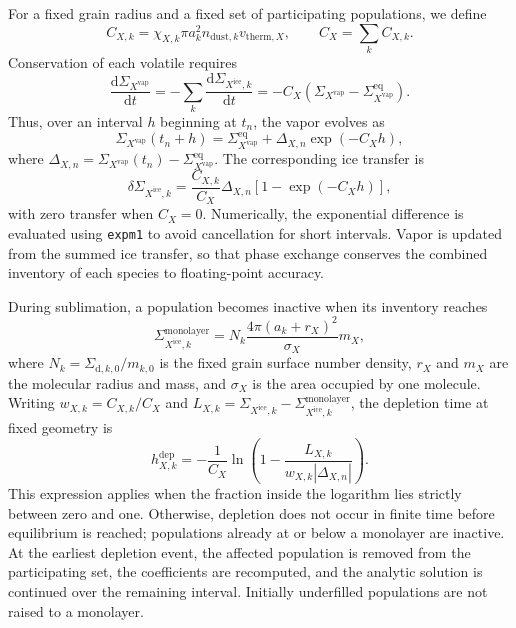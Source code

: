 For a fixed grain radius and a fixed set of participating populations,
we define
\begin{equation}
    C_{X,k}=\chi_{X,k}\pi a_k^2
    n_{\mathrm{dust},k}v_{\mathrm{therm},X},
    \qquad C_X=\sum_k C_{X,k}.
\end{equation}
Conservation of each volatile requires
\begin{equation}
    \frac{\mathrm d\Sigma_{X^{\mathrm{vap}}}}{\mathrm dt}
    =-\sum_k\frac{\mathrm d\Sigma_{X^{\mathrm{ice}},k}}{\mathrm dt}
    =-C_X\left(\Sigma_{X^{\mathrm{vap}}}
    -\Sigma_{X^{\mathrm{vap}}}^{\mathrm{eq}}\right).
\end{equation}
Thus, over an interval $h$ beginning at $t_n$, the vapor evolves as
\begin{equation}
    \Sigma_{X^{\mathrm{vap}}}(t_n+h)
    =\Sigma_{X^{\mathrm{vap}}}^{\mathrm{eq}}
    +\Delta_{X,n}\exp(-C_Xh),
    \label{eq:vapor_chem_solution}
\end{equation}
where $\Delta_{X,n}=\Sigma_{X^{\mathrm{vap}}}(t_n)
-\Sigma_{X^{\mathrm{vap}}}^{\mathrm{eq}}$. The corresponding ice
transfer is
\begin{equation}
    \delta\Sigma_{X^{\mathrm{ice}},k}
    =\frac{C_{X,k}}{C_X}\Delta_{X,n}
    \left[1-\exp(-C_Xh)\right],
    \label{eq:analytic_ice_substep}
\end{equation}
with zero transfer when $C_X=0$. Numerically, the exponential
difference is evaluated using \texttt{expm1} to avoid cancellation
for short intervals. Vapor is updated from the summed ice transfer,
so that phase exchange conserves the combined inventory of each
species to floating-point accuracy.

During sublimation, a population becomes inactive when its inventory
reaches
\begin{equation}
    \Sigma_{X^{\mathrm{ice}},k}^{\mathrm{monolayer}}
    =N_k\frac{4\pi(a_k+r_X)^2}{\sigma_X}m_X,
    \label{eq:monolayer_surface_density}
\end{equation}
where $N_k=\Sigma_{\mathrm d,k,0}/m_{k,0}$ is the fixed grain surface number density, $r_X$ and $m_X$
are the molecular radius and mass, and $\sigma_X$ is the area occupied
by one molecule. Writing $w_{X,k}=C_{X,k}/C_X$ and
$L_{X,k}=\Sigma_{X^{\mathrm{ice}},k}
-\Sigma_{X^{\mathrm{ice}},k}^{\mathrm{monolayer}}$, the depletion
time at fixed geometry is
\begin{equation}
    h_{X,k}^{\mathrm{dep}}
    =-\frac{1}{C_X}\ln\left(1-
    \frac{L_{X,k}}{w_{X,k}|\Delta_{X,n}|}\right).
\end{equation}
This expression applies when the fraction inside the logarithm lies
strictly between zero and one. Otherwise, depletion does not occur
in finite time before equilibrium is reached; populations already
at or below a monolayer are inactive. At the earliest depletion
event, the affected population is removed from the participating
set, the coefficients are recomputed, and the analytic solution is
continued over the remaining interval. Initially underfilled
populations are not raised to a monolayer.

